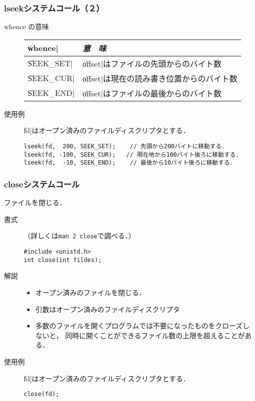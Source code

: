 \documentclass{beamer}                 %
\begin{document}
\begin{frame}[fragile]
  \frametitle{lseekシステムコール（２）}
\begin{description}
\item[whence の意味]
\begin{tabular}{l | l}
\hline\hline
\|whence|    & \emph{意　味} \\\hline
\|SEEK_SET|  &  \|offset|はファイルの先頭からのバイト数  \\
\|SEEK_CUR|  &  \|offset|は現在の読み書き位置からのバイト数  \\
\|SEEK_END|  &  \|offset|はファイルの最後からのバイト数  \\
\end{tabular}

\vfill

\item[使用例]
\|fd|はオープン済みのファイルディスクリプタとする．

\begin{lstlisting}[numbers=none]
lseek(fd,  200, SEEK_SET);    // 先頭から200バイトに移動する．
lseek(fd, -100, SEEK_CUR);   // 現在地から100バイト後ろに移動する．
lseek(fd,  -10, SEEK_END);    // 最後から10バイト後ろに移動する．
\end{lstlisting}

\end{description}
\end{frame}

\begin{frame}[fragile]
  \frametitle{closeシステムコール}
ファイルを閉じる．
\begin{description}
\item[書式]（詳しくは\texttt{man 2 close}で調べる．）

\begin{lstlisting}[numbers=none]
#include <unistd.h>
int close(int fildes);
\end{lstlisting}

\item[解説]
\begin{itemize}
\item オープン済みのファイルを閉じる．
\item 引数はオープン済みのファイルディスクリプタ
\item 多数のファイルを開くプログラムでは不要になったものをクローズしないと，
同時に開くことができるファイル数の上限を超えることがある．
\end{itemize}

\item[使用例]
\|fd|はオープン済みのファイルディスクリプタとする．

\begin{lstlisting}[numbers=none]
close(fd);
\end{lstlisting}
\end{description}
\end{frame}
\end{document}
